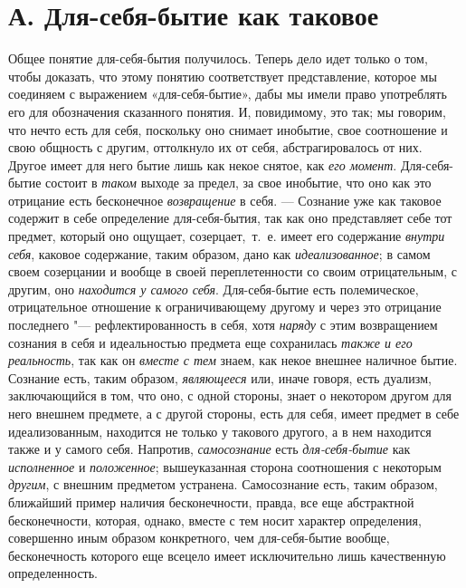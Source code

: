 \section*{А. Для-себя-бытие как таковое}
Общее понятие для-себя-бытия получилось. Теперь дело идет только о том,
чтобы доказать, что этому понятию соответствует представление, которое мы
соединяем с выражением «для-себя-бытие», дабы мы имели право употреблять
его для обозначения сказанного понятия. И, повидимому, это так; мы говорим,
что нечто есть для себя, поскольку оно снимает инобытие, свое соотношение и
свою общность с другим, оттолкнуло их от себя, абстрагировалось от них.
Другое имеет для него бытие лишь как некое снятое, как
{\em его момент}. Для-себя-бытие состоит в
{\em таком} выходе за предел, за свое инобытие, что оно
как это отрицание есть бесконечное {\em возвращение} в
себя. — Сознание уже как таковое содержит в себе определение
для-себя-бытия, так как оно представляет себе тот предмет, который оно
ощущает, созерцает,~т.~е. имеет его содержание
{\em внутри себя}, каковое содержание, таким образом,
дано как {\em идеализованное}; в самом своем созерцании
и вообще в своей переплетенности со своим отрицательным, с другим, оно
{\em находится у самого себя}. Для-себя-бытие есть
полемическое, отрицательное отношение к ограничивающему другому и через это
отрицание последнего "--- рефлектированность в себя, хотя
{\em наряду} с этим возвращением сознания в себя и
идеальностью предмета еще сохранилась {\em также и его
реальность}, так как он {\em вместе с тем} знаем, как
некое внешнее наличное бытие. Сознание есть, таким образом,
{\em являющееся} или, иначе говоря, есть дуализм,
заключающийся в том, что оно, с одной стороны, знает о некотором другом для
него внешнем предмете, а с другой стороны, есть для себя, имеет предмет в
себе идеализованным, находится не только у такового другого, а в нем
находится также и у самого себя. Напротив,
{\em самосознание} есть
{\em для-себя-бытие} как
{\em исполненное} и
{\em положенное}; вышеуказанная сторона соотношения с
некоторым {\em другим}, с внешним предметом устранена.
Самосознание есть, таким образом, ближайший пример наличия бесконечности,
правда, все еще абстрактной бесконечности, которая, однако, вместе с тем
носит характер определения, совершенно иным образом конкретного, чем
для-себя-бытие вообще, бесконечность которого еще всецело имеет
исключительно лишь качественную определенность.

